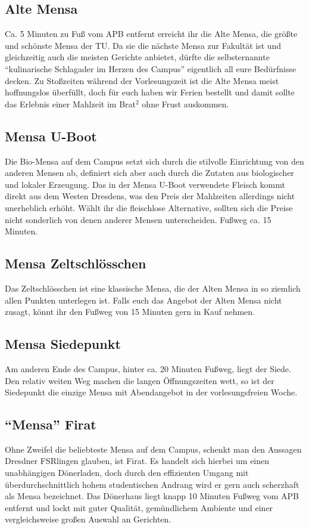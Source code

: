 \subsection*{Alte Mensa}
Ca. 5 Minuten zu Fuß vom APB entfernt erreicht ihr die Alte Mensa, die größte und schönste Mensa der TU\@.
Da sie die nächste Mensa zur Fakultät ist und gleichzeitig auch die meisten Gerichte anbietet, dürfte die selbsternannte \enquote{kulinarische Schlagader im Herzen des Campus} eigentlich all eure Bedürfnisse decken.
Zu Stoßzeiten während der Vorlesungszeit ist die Alte Mensa meist hoffnungslos überfüllt, doch für euch haben wir Ferien bestellt und damit sollte das Erlebnis einer Mahlzeit im Brat$^2$ ohne Frust auskommen.

\subsection*{Mensa U-Boot}
Die Bio-Mensa auf dem Campus setzt sich durch die stilvolle Einrichtung von den anderen Mensen ab, definiert sich aber auch durch die Zutaten aus biologischer und lokaler Erzeugung.
Das in der Mensa U-Boot verwendete Fleisch kommt direkt aus dem Westen Dresdens, was den Preis der Mahlzeiten allerdings nicht unerheblich erhöht.
Wählt ihr die fleischlose Alternative, sollten sich die Preise nicht sonderlich von denen anderer Mensen unterscheiden.
Fußweg ca. 15 Minuten.

\subsection*{Mensa Zeltschlösschen}
Das Zeltschlösschen ist eine klassische Mensa, die der Alten Mensa in so ziemlich allen Punkten unterlegen ist.
Falls euch das Angebot der Alten Mensa nicht zusagt, könnt ihr den Fußweg von 15 Minuten gern in Kauf nehmen.

\subsection*{Mensa Siedepunkt}
Am anderen Ende des Campus, hinter ca. 20 Minuten Fußweg, liegt der Siede.
Den relativ weiten Weg machen die langen Öffnungszeiten wett, so ist der Siedepunkt die einzige Mensa mit Abendangebot in der vorlesungsfreien Woche.

\subsection*{\enquote{Mensa} Firat}
Ohne Zweifel die beliebteste Mensa auf dem Campus, schenkt man den Aussagen Dresdner FSRlingen glauben, ist Firat.
Es handelt sich hierbei um einen unabhängigen Dönerladen, doch durch den effizienten Umgang mit überdurchschnittlich hohem studentischen Andrang wird er gern auch scherzhaft als Mensa bezeichnet.
Das Dönerhaus liegt knapp 10 Minuten Fußweg vom APB entfernt und lockt mit guter Qualität, gemündlichem Ambiente und einer vergleichsweise großen Auswahl an Gerichten.

